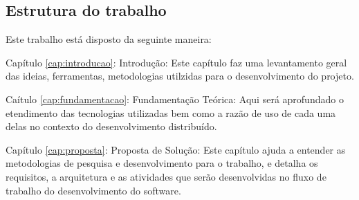 \subsection{Estrutura do trabalho}

Este trabalho está disposto da seguinte maneira:

Capítulo \ref{cap:introducao}: Introdução: Este capítulo faz uma levantamento geral das ideias, ferramentas, metodologias utilzidas para o desenvolvimento do projeto.

Caítulo \ref{cap:fundamentacao}: Fundamentação Teórica: Aqui será aprofundado o etendimento das tecnologias utilizadas bem como a razão de uso de cada uma delas no contexto do desenvolvimento distribuído.

Capítulo \ref{cap:proposta}: Proposta de Solução: Este capítulo ajuda a entender as metodologias de pesquisa e desenvolvimento para o trabalho, e detalha os requisitos, a arquitetura e as atividades que serão desenvolvidas no fluxo de trabalho do desenvolvimento do software.


